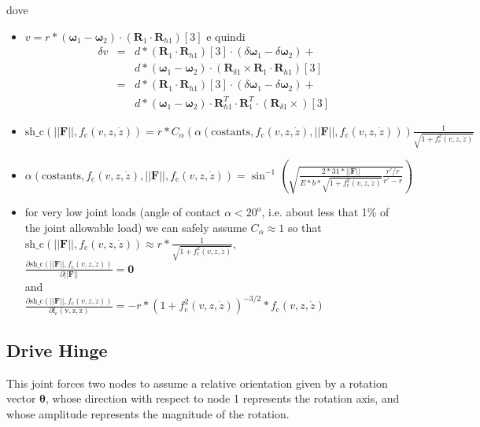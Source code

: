 \documentclass[10pt,dvips]{report}
\newcommand{\T}[1]{\boldsymbol{#1}}
\begin{document}
dove 
\begin{itemize}
\item
$v=r * (\T \omega_{1}-\T \omega_{2})\cdot(\T R_1\cdot \T R_{h1})[3]$
e quindi
\begin{eqnarray*}
\delta v &=& d * (\T R_1\cdot \T R_{h1})[3] \cdot (\delta \T \omega_{1}- \delta \T \omega_{2}) +\\
	&& d * (\T \omega_{1}-\T \omega_{2})\cdot (\T R_{\delta 1} \times \T R_1 \cdot \T R_{h1})[3]\\
	&=& d * (\T R_1\cdot \T R_{h1})[3] \cdot (\delta \T \omega_{1}- \delta \T \omega_{2}) +\\
	&& d * (\T \omega_{1}-\T \omega_{2})\cdot \T R_{h1}^T \cdot \T R_1^T \cdot (\T R_{\delta 1} \times )[3]
\end{eqnarray*}
\item
$
\mathrm{sh\_c}(||\T F||, f_{\mathrm{c}}(v,z,\dot{z}))=
r * 
C_\alpha(
	\alpha(\mathrm{costants},
		f_{\mathrm{c}}(v,z,\dot{z}),
		||\T F||,
		f_{\mathrm{c}}(v,z,\dot{z})
	)
) 
\frac{\displaystyle 1}{\displaystyle \sqrt{1+f_{\mathrm{c}}^2(v,z,\dot{z})}}
$
\item
$
\alpha(\mathrm{costants},
	f_{\mathrm{c}}(v,z,\dot{z}),
	||\T F||,
	f_{\mathrm{c}}(v,z,\dot{z})
) =
\sin^{-1}\left(
	\sqrt{
		\frac{\displaystyle 2*31*||\T F||}
			{\displaystyle E*b*\sqrt{1+f_{\mathrm{c}}^2(v,z,\dot{z})}}
		\frac{\displaystyle r'/r}
			{\displaystyle r'-r}
	}
\right)
$
\item for very low joint loads (angle of contact $\alpha< 20^{\mathrm{o}}$,
i.e. about less that 1\% of the joint allowable load)
we can safely assume $C_\alpha\approx 1$
so that\\ 
$
\mathrm{sh\_c}(||\T F||, f_{\mathrm{c}}(v,z,\dot{z}))\approx
r * 
\frac{\displaystyle 1}{\displaystyle \sqrt{1+f_{\mathrm{c}}^2(v,z,\dot{z})}}
$,\\

$
\frac{\displaystyle\partial \mathrm{sh\_c}(||\T F||, f_{\mathrm{c}}(v,z,\dot{z}))}
	{\displaystyle \partial ||\T F||} = \T 0
$\\
and\\
$
\frac{\displaystyle\partial \mathrm{sh\_c}(||\T F||, f_{\mathrm{c}}(v,z,\dot{z}))}
	{\displaystyle\partial \mathrm{f_{\mathrm{c}}(v,z,\dot{z})}} =
	-r * (1+f_{\mathrm{c}}^2(v,z,\dot{z}))^{-3/2}*f_{\mathrm{c}}(v,z,\dot{z})
$
\end{itemize}




\subsection{Drive Hinge}
This joint forces two nodes to assume a relative orientation
given by a rotation vector $\T{\theta}$, whose direction with respect
to node 1 represents the rotation axis, and whose amplitude represents 
the magnitude of the rotation.
\end{document}
